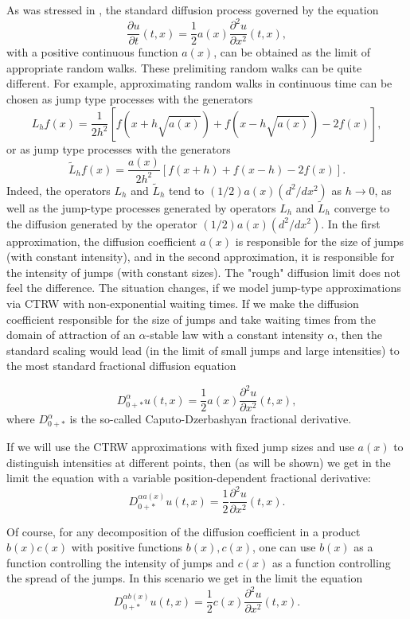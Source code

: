 \documentclass[12pt]{article}
\def\al{\alpha}
\def\pa{\partial}
\numberwithin{equation}{section}
\begin{document}
As was stressed in \cite{Ko22},
the standard diffusion process governed by the equation
\begin{equation}
\label{eqdifeq}
\frac{\pa u}{\pa t}(t,x) =\frac12 a(x) \frac{\pa ^2 u}{\pa x^2}(t,x),
\end{equation}
with a positive continuous function $a(x)$,
can be obtained as the limit of appropriate
random walks. These prelimiting random walks can be quite different. For example,
approximating random walks in continuous time can be chosen as jump type processes with the generators
\[
L_hf(x)=\frac{1}{2h^2}[f(x+ h\sqrt{a(x)})+f(x- h\sqrt{a(x)})-2f(x)],
\]
or as jump type processes with the generators
\[
\tilde L_hf(x)=\frac{a(x)}{2h^2}[f(x+ h)+f(x- h)-2f(x)].
\]
Indeed, the operators $L_h$ and $\tilde L_h$ tend to $(1/2)a(x)(d^2/dx^2)$ as $h\to 0$, as well as the jump-type processes generated by operators $L_h$ and $\tilde L_h$ converge to the diffusion generated by the operator $(1/2)a(x)(d^2/dx^2)$.
In the first approximation, the diffusion coefficient $a(x)$ is responsible for the size of jumps (with constant intensity),
and in the second approximation, it is responsible for the intensity of jumps (with constant sizes).
The "rough" diffusion limit does not feel the difference.
The situation changes, if we model jump-type approximations via CTRW with non-exponential waiting times.
If we make the diffusion coefficient responsible for the size of jumps and take
waiting times from the domain of attraction of an $\alpha$-stable law with a constant intensity $\al$,
then the standard scaling would lead (in the limit
of small jumps and large intensities) to the most standard fractional diffusion equation

\begin{equation}
\label{eqdifeqfr}
D^{\al}_{0+*} u(t,x) =\frac12 a(x) \frac{\pa ^2 u}{\pa x^2}(t,x),
\end{equation}
where $D^{\al}_{0+*}$ is the so-called Caputo-Dzerbashyan fractional derivative.

If we will use the CTRW approximations with fixed jump sizes and use $a(x)$
to distinguish intensities at different points, then (as will be shown) we get in
the limit the equation with a variable position-dependent fractional derivative:
\begin{equation}
\label{eqdifeqfr1}
D^{\al a(x)}_{0+*} u(t,x) =\frac12 \frac{\pa ^2 u}{\pa x^2}(t,x).
\end{equation}

Of course, for any decomposition of the diffusion coefficient in a product $b(x)c(x)$ with positive functions $b(x),c(x)$, one can use $b(x)$ as a function controlling the intensity of jumps and $c(x)$ as a function controlling the spread of the jumps.
In this scenario we get in the limit the equation
\begin{equation}
\label{eqdifeqfr2}
D^{\al b(x)}_{0+*} u(t,x) =\frac12 c(x) \frac{\pa ^2 u}{\pa x^2}(t,x).
\end{equation}
\end{document}

